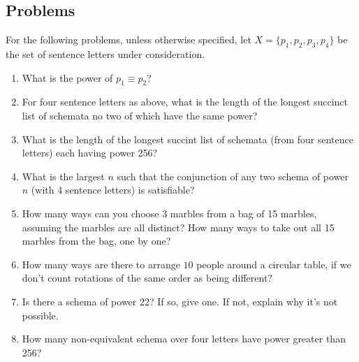 \newpage
\begin{mdframed}[linewidth=1]
\section*{Problems}
For the following problems, unless otherwise specified, let $X = \{p_1, p_2, p_3, p_4\}$ be the set of sentence letters under consideration. 
\begin{enumerate}
    \item What is the power of $p_1 \equiv p_2$?

    \item For four sentence letters as above, what is the length of the longest succinct list of schemata no two of which have the same power?

    \item What is the length of the longest succint list of schemata (from four sentence letters) each having power 256?

    \item What is the largest $n$ such that the conjunction of any two schema of power $n$ (with 4 sentence letters) is satisfiable?

    \item How many ways can you choose 3 marbles from a bag of 15 marbles, assuming the marbles are all distinct? How many ways to take out all 15 marbles from the bag, one by one? 

    \item How many ways are there to arrange $10$ people around a circular table, if we don't count rotations of the same order as being different?

    \item Is there a schema of power 22? If so, give one. If not, explain why it's not possible.

    \item How many non-equivalent schema over four letters have power greater than 256?
\end{enumerate}
\end{mdframed}

